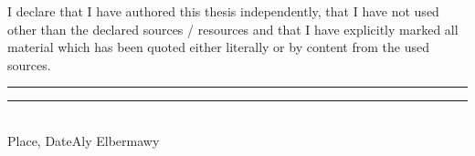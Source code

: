 \documentclass[11pt,a4paper,oneside]{report}
\begin{document}
\vspace{1cm}
\noindent I declare that I have authored this thesis independently, that I have
not used other than the declared sources / resources and that I have explicitly
marked all material which has been quoted either literally or by content from
the used sources.

\vspace{3cm}
\noindent
\rule{6cm}{0.4pt}\hfill\rule{6cm}{0.4pt}\\
\hspace*{1cm}Place, Date\hfill Aly Elbermawy\hspace*{2cm}
\end{document}
